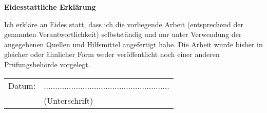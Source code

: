 \newpage
\thispagestyle{empty}
\begin{center}
	\vspace*{5em}
	\huge\textbf{Eidesstattliche Erklärung}\\
\end{center}
\vspace{2em}
Ich erkläre an Eides statt, dass ich die vorliegende Arbeit (entsprechend  der genannten Verantwortlichkeit) selbstständig und nur unter Verwendung der angegebenen Quellen und Hilfsmittel angefertigt habe. Die Arbeit wurde bisher in gleicher oder ähnlicher Form weder veröffentlicht noch einer anderen Prüfungsbehörde vorgelegt.    

\vspace{4em}
\begin{minipage}{\linewidth}
	\begin{tabular}{p{15em}p{15em}}
		Datum: &  .......................................................\\
		& \centering (Unterschrift)\\
	\end{tabular}
\end{minipage}